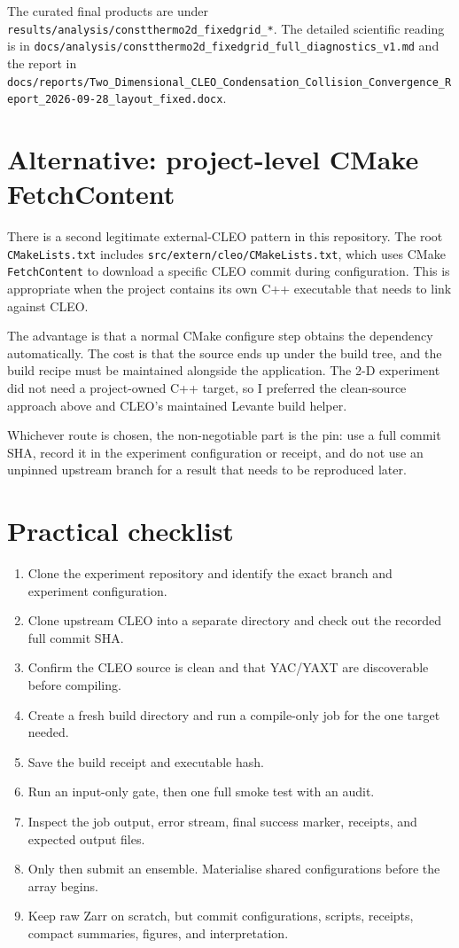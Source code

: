 \documentclass[11pt,a4paper]{article}
\begin{document}
The curated final products are under \texttt{results/analysis/constthermo2d\_fixedgrid\_*}. The detailed scientific reading is in \texttt{docs/analysis/constthermo2d\_fixedgrid\_full\_diagnostics\_v1.md} and the report in \texttt{docs/reports/Two\_Dimensional\_CLEO\_Condensation\_Collision\_Convergence\_Report\_2026-09-28\_layout\_fixed.docx}.

\section{Alternative: project-level CMake FetchContent}

There is a second legitimate external-CLEO pattern in this repository. The root \texttt{CMakeLists.txt} includes \texttt{src/extern/cleo/CMakeLists.txt}, which uses CMake \texttt{FetchContent} to download a specific CLEO commit during configuration. This is appropriate when the project contains its own C++ executable that needs to link against CLEO.

The advantage is that a normal CMake configure step obtains the dependency automatically. The cost is that the source ends up under the build tree, and the build recipe must be maintained alongside the application. The 2-D experiment did not need a project-owned C++ target, so I preferred the clean-source approach above and CLEO's maintained Levante build helper.

Whichever route is chosen, the non-negotiable part is the pin: use a full commit SHA, record it in the experiment configuration or receipt, and do not use an unpinned upstream branch for a result that needs to be reproduced later.

\section{Practical checklist}

\begin{enumerate}
  \item Clone the experiment repository and identify the exact branch and experiment configuration.
  \item Clone upstream CLEO into a separate directory and check out the recorded full commit SHA.
  \item Confirm the CLEO source is clean and that YAC/YAXT are discoverable before compiling.
  \item Create a fresh build directory and run a compile-only job for the one target needed.
  \item Save the build receipt and executable hash.
  \item Run an input-only gate, then one full smoke test with an audit.
  \item Inspect the job output, error stream, final success marker, receipts, and expected output files.
  \item Only then submit an ensemble. Materialise shared configurations before the array begins.
  \item Keep raw Zarr on scratch, but commit configurations, scripts, receipts, compact summaries, figures, and interpretation.
\end{enumerate}
\end{document}
